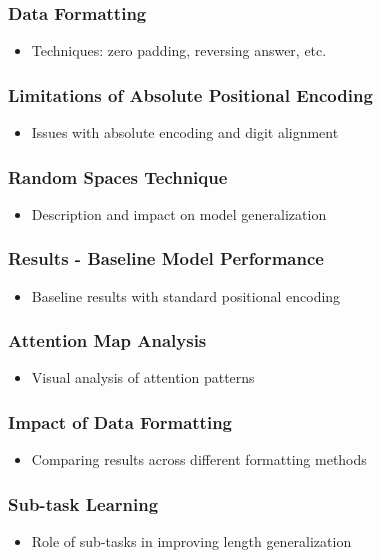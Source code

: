 \documentclass[14pt,aspectratio=169]{beamer}
\theoremstyle{remark}
\begin{document}
\begin{frame}
    \frametitle{Data Formatting}
    \begin{itemize}
        \item Techniques: zero padding, reversing answer, etc.
    \end{itemize}
\end{frame}

\begin{frame}
    \frametitle{Limitations of Absolute Positional Encoding}
    \begin{itemize}
        \item Issues with absolute encoding and digit alignment
    \end{itemize}
\end{frame}

\begin{frame}
    \frametitle{Random Spaces Technique}
    \begin{itemize}
        \item Description and impact on model generalization
    \end{itemize}
\end{frame}

\begin{frame}
    \frametitle{Results - Baseline Model Performance}
    \begin{itemize}
        \item Baseline results with standard positional encoding
    \end{itemize}
\end{frame}

\begin{frame}
    \frametitle{Attention Map Analysis}
    \begin{itemize}
        \item Visual analysis of attention patterns
    \end{itemize}
\end{frame}

\begin{frame}
    \frametitle{Impact of Data Formatting}
    \begin{itemize}
        \item Comparing results across different formatting methods
    \end{itemize}
\end{frame}

\begin{frame}
    \frametitle{Sub-task Learning}
    \begin{itemize}
        \item Role of sub-tasks in improving length generalization
    \end{itemize}
\end{frame}
\end{document}
